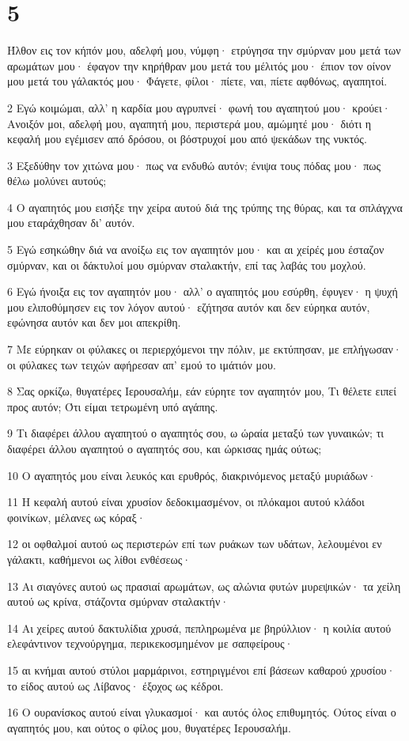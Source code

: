 \chapter{5}

\par Ήλθον εις τον κήπόν μου, αδελφή μου, νύμφη· ετρύγησα την σμύρναν μου μετά των αρωμάτων μου· έφαγον την κηρήθραν μου μετά του μέλιτός μου· έπιον τον οίνον μου μετά του γάλακτός μου· Φάγετε, φίλοι· πίετε, ναι, πίετε αφθόνως, αγαπητοί.
\par 2 Εγώ κοιμώμαι, αλλ' η καρδία μου αγρυπνεί· φωνή του αγαπητού μου· κρούει· Ανοιξόν μοι, αδελφή μου, αγαπητή μου, περιστερά μου, αμώμητέ μου· διότι η κεφαλή μου εγέμισεν από δρόσου, οι βόστρυχοί μου από ψεκάδων της νυκτός.
\par 3 Εξεδύθην τον χιτώνα μου· πως να ενδυθώ αυτόν; ένιψα τους πόδας μου· πως θέλω μολύνει αυτούς;
\par 4 Ο αγαπητός μου εισήξε την χείρα αυτού διά της τρύπης της θύρας, και τα σπλάγχνα μου εταράχθησαν δι' αυτόν.
\par 5 Εγώ εσηκώθην διά να ανοίξω εις τον αγαπητόν μου· και αι χείρές μου έσταζον σμύρναν, και οι δάκτυλοί μου σμύρναν σταλακτήν, επί τας λαβάς του μοχλού.
\par 6 Εγώ ήνοιξα εις τον αγαπητόν μου· αλλ' ο αγαπητός μου εσύρθη, έφυγεν· η ψυχή μου ελιποθύμησεν εις τον λόγον αυτού· εζήτησα αυτόν και δεν εύρηκα αυτόν, εφώνησα αυτόν και δεν μοι απεκρίθη.
\par 7 Με εύρηκαν οι φύλακες οι περιερχόμενοι την πόλιν, με εκτύπησαν, με επλήγωσαν· οι φύλακες των τειχών αφήρεσαν απ' εμού το ιμάτιόν μου.
\par 8 Σας ορκίζω, θυγατέρες Ιερουσαλήμ, εάν εύρητε τον αγαπητόν μου, Τι θέλετε ειπεί προς αυτόν; Ότι είμαι τετρωμένη υπό αγάπης.
\par 9 Τι διαφέρει άλλου αγαπητού ο αγαπητός σου, ω ώραία μεταξύ των γυναικών; τι διαφέρει άλλου αγαπητού ο αγαπητός σου, και ώρκισας ημάς ούτως;
\par 10 Ο αγαπητός μου είναι λευκός και ερυθρός, διακρινόμενος μεταξύ μυριάδων·
\par 11 Η κεφαλή αυτού είναι χρυσίον δεδοκιμασμένον, οι πλόκαμοι αυτού κλάδοι φοινίκων, μέλανες ως κόραξ·
\par 12 οι οφθαλμοί αυτού ως περιστερών επί των ρυάκων των υδάτων, λελουμένοι εν γάλακτι, καθήμενοι ως λίθοι ενθέσεως·
\par 13 Αι σιαγόνες αυτού ως πρασιαί αρωμάτων, ως αλώνια φυτών μυρεψικών· τα χείλη αυτού ως κρίνα, στάζοντα σμύρναν σταλακτήν·
\par 14 Αι χείρες αυτού δακτυλίδια χρυσά, πεπληρωμένα με βηρύλλιον· η κοιλία αυτού ελεφάντινον τεχνούργημα, περικεκοσμημένον με σαπφείρους·
\par 15 αι κνήμαι αυτού στύλοι μαρμάρινοι, εστηριγμένοι επί βάσεων καθαρού χρυσίου· το είδος αυτού ως Λίβανος· έξοχος ως κέδροι.
\par 16 Ο ουρανίσκος αυτού είναι γλυκασμοί· και αυτός όλος επιθυμητός. Ούτος είναι ο αγαπητός μου, και ούτος ο φίλος μου, θυγατέρες Ιερουσαλήμ.

